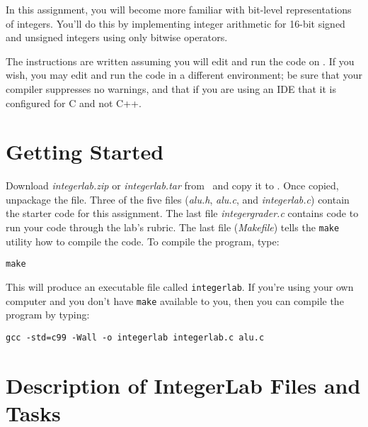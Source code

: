 


\renewcommand{\labnumber}{3}
\renewcommand{\labname}{Integer Representation and Arithmetic Lab}
\renewcommand{\shortlabname}{integerlab}
\renewcommand{\collaborationrules}{\individualeffort}
\renewcommand{\duedate}{Week of February 22, before the start of your lab section}
\startdocument




In this assignment, you will become more familiar with bit-level
representations of integers.  You'll do this by implementing integer arithmetic
for 16-bit signed and unsigned integers using only bitwise operators.

The instructions are written assuming you will edit and run the code on
\runtimeenvironment. If you wish, you may edit and run the code
in a different environment; be sure that your compiler suppresses no warnings,
and that if you are using an IDE that it is configured for C and not C++.

\section{Getting Started}

Download \textit{\shortlabname.zip} or \textit{\shortlabname.tar} from
\filesource\ and copy it to \runtimeenvironment. Once copied, unpackage the
file. Three of the five files (\textit{alu.h}, \textit{alu.c}, and
\textit{integerlab.c}) contain the starter code for this assignment. The last
file \textit{integergrader.c} contains code to run your code through the lab's
rubric. The last file (\textit{Makefile}) tells the \texttt{make} utility how
to compile the code. To compile the program, type:

\texttt{make}

This will produce an executable file called \texttt{integerlab}.  If you're
using your own computer and you don't have \texttt{make} available to you, then
you can compile the program by typing:

\texttt{gcc -std=c99 -Wall -o integerlab integerlab.c alu.c}

\section{Description of IntegerLab Files and Tasks}

